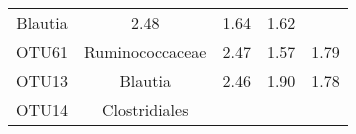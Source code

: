 \documentclass[12pt,]{article}
\begin{document}
\begin{longtable}[]{@{}ccccc@{}}
\begin{minipage}[t]{0.18\columnwidth}
Blautia\strut
\end{minipage} & \begin{minipage}[t]{0.17\columnwidth}\centering\strut
2.48\strut
\end{minipage} & \begin{minipage}[t]{0.25\columnwidth}\centering\strut
1.64\strut
\end{minipage} & \begin{minipage}[t]{0.19\columnwidth}\centering\strut
1.62\strut
\end{minipage}\tabularnewline
\begin{minipage}[t]{0.07\columnwidth}\centering\strut
OTU61\strut
\end{minipage} & \begin{minipage}[t]{0.18\columnwidth}\centering\strut
Ruminococcaceae\strut
\end{minipage} & \begin{minipage}[t]{0.17\columnwidth}\centering\strut
2.47\strut
\end{minipage} & \begin{minipage}[t]{0.25\columnwidth}\centering\strut
1.57\strut
\end{minipage} & \begin{minipage}[t]{0.19\columnwidth}\centering\strut
1.79\strut
\end{minipage}\tabularnewline
\begin{minipage}[t]{0.07\columnwidth}\centering\strut
OTU13\strut
\end{minipage} & \begin{minipage}[t]{0.18\columnwidth}\centering\strut
Blautia\strut
\end{minipage} & \begin{minipage}[t]{0.17\columnwidth}\centering\strut
2.46\strut
\end{minipage} & \begin{minipage}[t]{0.25\columnwidth}\centering\strut
1.90\strut
\end{minipage} & \begin{minipage}[t]{0.19\columnwidth}\centering\strut
1.78\strut
\end{minipage}\tabularnewline
\begin{minipage}[t]{0.07\columnwidth}\centering\strut
OTU14\strut
\end{minipage} & \begin{minipage}[t]{0.18\columnwidth}\centering\strut
Clostridiales\strut
\end{minipage} & \begin{minipage}[t]{0.17\columnwidth}\centering\strut

\end{minipage}
\end{longtable}
\end{document}
